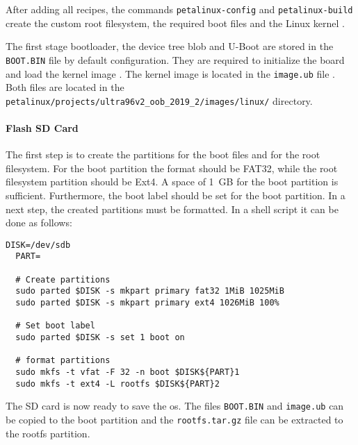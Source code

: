 After adding all recipes, the commands \texttt{petalinux-config} and \texttt{petalinux-build} create the custom root filesystem, the required boot files and the Linux kernel \cite{petalinux_user_guide}.

The first stage bootloader, the device tree blob and U-Boot are stored in the \texttt{BOOT.BIN} file by default configuration.
They are required to initialize the board and load the kernel image \cite{xilinx_wiki_boot}.
The kernel image is located in the \texttt{image.ub} file \cite{xilinx_wiki_uboot}.
Both files are located in the \texttt{petalinux/projects/ultra96v2\_oob\_2019\_2/images/linux/} directory.

\paragraph{Flash SD Card}
The first step is to create the partitions for the boot files and for the root filesystem.
For the boot partition the format should be FAT32, while the root filesystem partition should be Ext4.
A space of \SI{1}{GB} for the boot partition is sufficient.
Furthermore, the boot label should be set for the boot partition.
In a next step, the created partitions must be formatted.
In a shell script it can be done as follows:

\begin{lstlisting}[style=bash, caption={Prepare SD card}, label=lst:create_partitions]
  DISK=/dev/sdb
  PART=

  # Create partitions
  sudo parted $DISK -s mkpart primary fat32 1MiB 1025MiB
  sudo parted $DISK -s mkpart primary ext4 1026MiB 100%

  # Set boot label
  sudo parted $DISK -s set 1 boot on

  # format partitions
  sudo mkfs -t vfat -F 32 -n boot $DISK${PART}1
  sudo mkfs -t ext4 -L rootfs $DISK${PART}2
\end{lstlisting}

The SD card is now ready to save the \acrshort{os}.
The files \texttt{BOOT.BIN} and \texttt{image.ub} can be copied to the boot partition and the \texttt{rootfs.tar.gz} file can be extracted to the rootfs partition.

